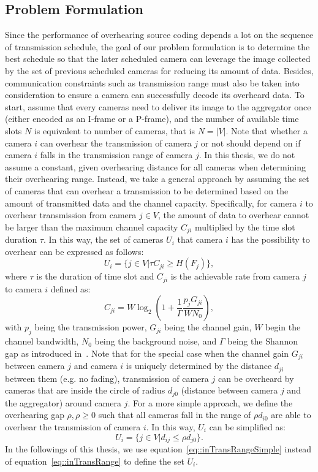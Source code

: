 \subsection{Problem Formulation}
Since the performance of overhearing source coding depends a lot on the sequence of transmission schedule, the goal of our problem formulation is to determine the best schedule so that the later scheduled camera can leverage the image collected by the set of previous scheduled cameras for reducing its amount of data.
Besides, communication constraints such as transmission range must also be taken into consideration to ensure a camera can successfully decode its overheard data.
%
To start, assume that every cameras need to deliver its image to the aggregator once (either encoded as an I-frame or a P-frame), and the number of available time slots $N$ is equivalent to number of cameras, that is ${N=|V|}$.
Note that whether a camera $i$ can overhear the transmission of camera $j$ or not should depend on if camera $i$ falls in the transmission range of camera $j$.
In this thesis, we do not assume a constant, given overhearing distance for all cameras when determining their overhearing range.
Instead, we take a general approach by assuming the set of cameras that can overhear a transmission to be determined based on the amount of transmitted data and the channel capacity.
Specifically, for camera $i$ to overhear transmission from camera $j \in V$, the amount of data to overhear cannot be larger than the maximum channel capacity $C_{ji}$ multiplied by the time slot duration $\tau$.
In this way, the set of cameras $U_i$ that camera $i$ has the possibility to overhear can be expressed as follows:
\begin{equation}
U_i = \{ j \in V | \tau C_{ji} \geq H(F_j) \},
\label{eq::inTransRange}
\end{equation}
where $\tau$ is the duration of time slot and $C_{ji}$ is the achievable rate from camera $j$ to camera $i$ defined as:
\begin{equation}
C_{ji} = W \log_2 \left( 1+\frac{1}{\Gamma} \frac{p_j G_{ji}}{WN_0} \right),
\label{eq::capacity}
\end{equation}
with $p_j$ being the transmission power, $G_{ji}$ being the channel gain, $W$ begin the channel bandwidth, $N_0$ being the background noise, and $\Gamma$ being the Shannon gap as introduced in~\cite{MQAM}.
Note that for the special case when the channel gain $G_{ji}$ between camera $j$ and camera $i$ is uniquely determined by the distance $d_{ji}$ between them (e.g. no fading), transmission of camera $j$ can be overheard by cameras that are inside the circle of radius $d_{j0}$ (distance between camera $j$ and the aggregator) around camera $j$.
For a more simple approach, we define the overhearing gap ${\rho, \rho \geq 0}$ such that all cameras fall in the range of $\rho d_{i0}$ are able to overhear the transmission of camera $i$.
In this way, $U_i$ can be simplified as:
\begin{equation}
U_i = \{ j \in V | d_{ij} \leq \rho d_{j0} \}.
\label{eq::inTransRangeSimple}
\end{equation}
In the followings of this thesis, we use equation~\eqref{eq::inTransRangeSimple} instead of equation~\eqref{eq::inTransRange} to define the set $U_i$.

